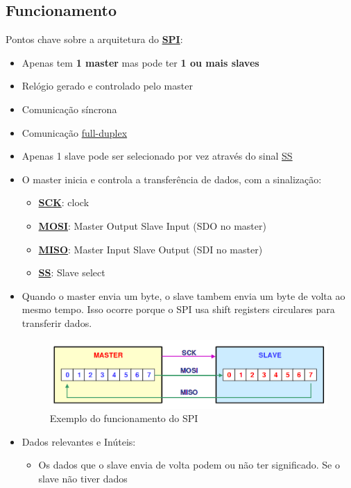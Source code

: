 \documentclass[a4paper, 12pt, onecolumn, oneside]{scrartcl}
\begin{document}
\subsection{Funcionamento}
Pontos chave sobre a arquitetura do \hyperref[spi]{\textbf{SPI}}:\@
\begin{itemize}
    \item Apenas tem \textbf{1 master} mas pode ter \textbf{1 ou mais slaves}
    \item Relógio gerado e controlado pelo master
    \item Comunicação síncrona
    \item Comunicação \hyperref[fullduplex]{full-duplex}
    \item Apenas 1 slave pode ser selecionado por vez através do sinal \hyperref[ss]{SS}
    \item O master inicia e controla a transferência de dados, com a sinalização:
    \begin{itemize}
        \item \hyperref[sck]{\large\textbf{{SCK}}}: clock
        \item \hyperref[mosi]{\large\textbf{{MOSI}}}: Master Output Slave Input (SDO no
        master)
        \item \hyperref[miso]{\large\textbf{{MISO}}}: Master Input Slave Output (SDI no
        master)
        \item \hyperref[ss]{\large\textbf{{SS}}}: Slave select
    \end{itemize} 
    \item Quando o master envia um byte, o slave tambem envia um byte de volta ao mesmo tempo.
    Isso ocorre porque o SPI usa shift registers circulares para transferir dados.
    \begin{figure}[h]
        \centering
        \includegraphics[width=1\textwidth]{Funcionamento_SPI.png}
        \caption{Exemplo do funcionamento do SPI}\label{fig1}
    \end{figure}
    \item Dados relevantes e Inúteis:
    \begin{itemize}
        \item Os dados que o slave envia de volta podem ou não ter significado. Se o slave não tiver dados 

\end{itemize}
\end{itemize}
\end{document}
